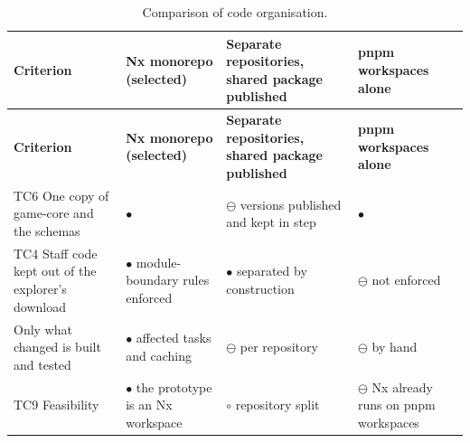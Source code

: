 {\small{}\renewcommand{\arraystretch}{1.1}
\begin{longtable}{|>{\raggedright\arraybackslash}p{}|>{\raggedright\arraybackslash}p{}|>{\raggedright\arraybackslash}p{}|>{\raggedright\arraybackslash}p{}|}
\caption{Comparison of code organisation.} \\
\hline
\textbf{Criterion} & \textbf{Nx monorepo (selected)} & \textbf{Separate repositories, shared package published} & \textbf{pnpm workspaces alone} \\ \hline
\endfirsthead
\hline
\textbf{Criterion} & \textbf{Nx monorepo (selected)} & \textbf{Separate repositories, shared package published} & \textbf{pnpm workspaces alone} \\ \hline
\endhead
TC6 One copy of game-core and the schemas & $\bullet$ & $\ominus$ versions published and kept in step & $\bullet$ \\ \hline
TC4 Staff code kept out of the explorer's download & $\bullet$ module-\allowbreak{}boundary rules enforced\cite{r158} & $\bullet$ separated by construction & $\ominus$ not enforced \\ \hline
Only what changed is built and tested & $\bullet$ affected tasks and caching\cite{r158} & $\ominus$ per repository & $\ominus$ by hand \\ \hline
TC9 Feasibility & $\bullet$ the prototype is an Nx workspace & $\circ$ repository split & $\ominus$ Nx already runs on pnpm workspaces \\ \hline
\end{longtable}
}

